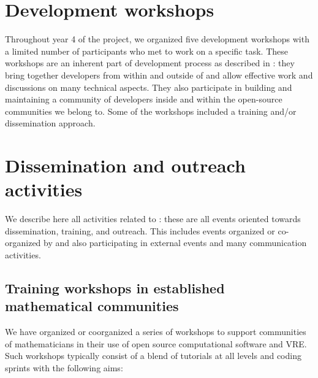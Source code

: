 \documentclass{deliverablereport}
\author{Viviane Pons et al.}
\begin{document}
\maketitle
\githubissuedescription
\newpage
\tableofcontents
\newpage

\section{Development workshops}

Throughout year 4 of the project, we organized five development
workshops with a limited number of participants who met to work on a
specific task. These workshops are an inherent part of \ODK
development process as described in :
they bring together developers from within and outside of \ODK and
allow effective work and discussions on many technical aspects. They
also participate in building and maintaining a community of developers
inside \ODK and within the open-source communities we belong to. Some
of the workshops included a training and/or dissemination approach.















\section{Dissemination and outreach activities}

We describe here all activities related to :
these are all events oriented towards dissemination, training, and outreach. This
includes events organized or co-organized by \ODK and also
participating in external events and many communication activities.

\subsection{Training workshops in established mathematical communities}

We have organized or coorganized a series of workshops to support
communities of mathematicians in their use of open source
computational software and VRE. Such workshops typically consist of a
blend of tutorials at all levels and coding sprints with the following
aims:
\end{document}
